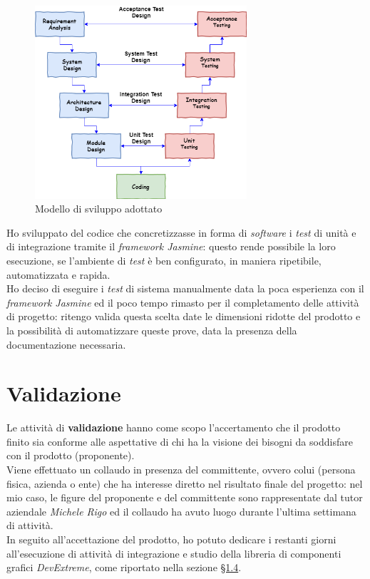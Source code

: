 \begin{figure}[H]
    \centering
    \includegraphics[width=0.7\textwidth]{images/v-model.png}
    \caption[Modello di sviluppo del prodotto adottato]{Modello di sviluppo adottato\footnotemark}
\end{figure}
Ho sviluppato del codice che concretizzasse in forma di \textit{software} i \textit{test} di unità e di integrazione tramite il \textit{framework Jasmine}: questo rende possibile la loro esecuzione, se l'ambiente di \textit{test} è ben configurato, in maniera ripetibile, automatizzata e rapida. \\
Ho deciso di eseguire i \textit{test} di sistema manualmente data la poca esperienza con il \textit{framework Jasmine} ed il poco tempo rimasto per il completamento delle attività di progetto: ritengo valida questa scelta date le dimensioni ridotte del prodotto e la possibilità di automatizzare queste prove, data la presenza della documentazione necessaria.

\section{Validazione}
\label{sec:validazione}
Le attività di \textbf{validazione} hanno come scopo l'accertamento che il prodotto finito sia conforme alle aspettative di chi ha la visione dei bisogni da soddisfare con il prodotto (proponente). \\
Viene effettuato un collaudo in presenza del committente, ovvero colui (persona fisica, azienda o ente) che ha interesse diretto nel risultato finale del progetto: nel mio caso, le figure del proponente e del committente sono rappresentate dal tutor aziendale \textit{Michele Rigo} ed il collaudo
ha avuto luogo durante l'ultima settimana di attività. \\
In seguito all'accettazione del prodotto, ho potuto dedicare i restanti giorni all'esecuzione di attività di integrazione e studio della libreria di componenti grafici \textit{DevExtreme}, come riportato nella sezione \hyperref[sec:innovazione]{§1.4}.



